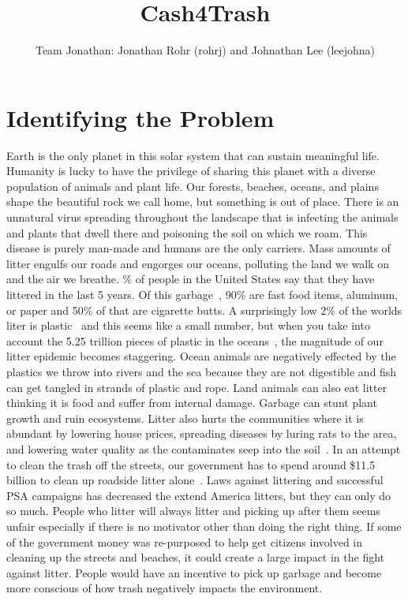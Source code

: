 \documentclass[letterpaper,12pt,titlepage]{article}
\title{Cash4Trash}
\author{Team Jonathan: Jonathan Rohr (rohrj) and Johnathan Lee (leejohna)}
\begin{document}
\maketitle

\section{Identifying the Problem}
Earth is the only planet in this solar system that can sustain meaningful life. Humanity is lucky to have the privilege of sharing this planet with a diverse population of animals and plant life. Our forests, beaches, oceans, and plains shape the beautiful rock we call home, but something is out of place. There is an unnatural virus spreading throughout the landscape that is infecting the animals and plants that dwell there and poisoning the soil on which we roam. This disease is purely man-made and humans are the only carriers. Mass amounts of litter engulfs our roads and engorges our oceans, polluting the land we walk on and the air we breathe.
\newline
{}\% of people in the United States say that they have littered in the last 5 years. Of this garbage~\cite{litterfactslutherking}, 90\% are fast food items, aluminum, or paper and 50\% of that are cigarette butts. A surprisingly low 2\% of the worlds liter is plastic~\cite{infographic} and this seems like a small number, but when you take into account the 5.25 trillion pieces of plastic in the oceans~\cite{oceantrash}, the magnitude of our litter epidemic becomes staggering. Ocean animals are negatively effected by the plastics we throw into rivers and the sea because they are not digestible and fish can get tangled in strands of plastic and rope. Land animals can also eat litter thinking it is food and suffer from internal damage. Garbage can stunt plant growth and ruin ecosystems. Litter also hurts the communities where it is abundant by lowering house prices, spreading diseases by luring rats to the area, and lowering water quality as the contaminates seep into the soil~\cite{litterfacts}.
\newline
\newline
In an attempt to clean the trash off the streets, our government has to spend around \$11.5 billion to clean up roadside litter alone~\cite{litterfactslutherking}. Laws against littering and successful PSA campaigns has decreased the extend America litters, but they can only do so much. People who litter will always litter and picking up after them seems unfair especially if there is no motivator other than doing the right thing. If some of the government money was re-purposed to help get citizens involved in cleaning up the streets and beaches, it could create a large impact in the fight against litter. People would have an incentive to pick up garbage and become more conscious of how trash negatively impacts the environment.
\newpage
\end{document}

